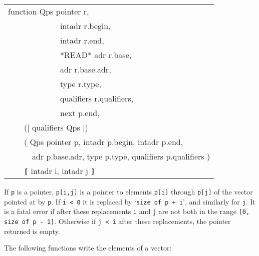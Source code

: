 \documentclass[12pt]{article}
\makeatletter
\newcommand{\TT}[1]{{\tt \bfseries #1}}
\newcommand{\ttmindex}[2]{\index{#1@{\tt #1}!#2}}
\newenvironment{indpar}[1][0.3in]%
	{\begin{list}{}%
		     {\setlength{\itemsep}{0in}%
		      \setlength{\topsep}{0in}%
		      \setlength{\parsep}{1ex}%
		      \setlength{\labelwidth}{#1}%
		      \setlength{\leftmargin}{#1}%
		      \addtolength{\leftmargin}{\labelsep}}%
	 \item}%
	{\end{list}}
\makeatother
\begin{document}
\begin{indpar}
{\tt\begin{tabular}{@{}l}
function Qps pointer r, \\
~~~~~~~~~~~~~intadr r.begin, \\
~~~~~~~~~~~~~intadr r.end, \\
~~~~~~~~~~~~~*READ* adr r.base, \\
~~~~~~~~~~~~~adr r.base.adr, \\
~~~~~~~~~~~~~type r.type, \\
~~~~~~~~~~~~~qualifiers r.qualifiers, \\
~~~~~~~~~~~~~next p.end, \\
~~~~(| qualifiers Qps |) \\
~~~~( Qps pointer p, intadr p.begin, intadr p.end, \\
~~~~~~adr p.base.adr, type p.type, qualifiers p.qualifiers ) \\
~~~~\TT{[} intadr i, intadr j \TT{]}\ttmindex{[]}{subvector} \\
\end{tabular}}

\begin{indpar}
If {\tt p} is a pointer, {\tt p[i,j]} is a pointer to elements
{\tt p[i]} through {\tt p[j]} of the vector pointed at by {\tt p}.
If {\tt i < 0} it is replaced by `{\tt size of p + i}', and similarly
for {\tt j}.
It is a fatal error if after these replacements {\tt i} and {\tt j}
are not both in the range {\tt [0, size of p - 1]}.
Otherwise if {\tt j < i} after these replacements,
the pointer returned is empty.
\end{indpar}


\end{indpar}

The following functions write the elements of a vector:
\end{document}
